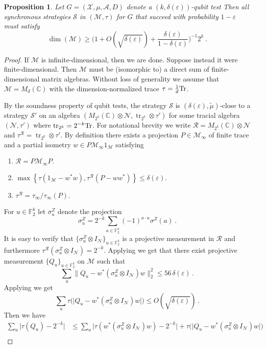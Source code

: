 \documentclass[11pt]{article}
\newtheorem{proposition}[theorem]{Proposition}
\theoremstyle{definition}
\newcommand{\strategy}{\mathscr{S}}
\newcommand{\Tr}{\mbox{\rm Tr}}
\newcommand{\C}{\ensuremath{\mathbb{C}}}
\newcommand{\F}{\ensuremath{\mathbb{F}}}
\newcommand{\mA}{\ensuremath{\mathcal{A}}}
\newcommand{\mM}{\ensuremath{\mathcal{M}}}
\newcommand{\mR}{\ensuremath{\mathcal{R}}}
\newcommand{\mX}{\ensuremath{\mathcal{X}}}
\newcommand{\eps}{\varepsilon}
\newcommand{\mN}{\mathcal{N}}
\DeclareMathOperator{\tr}{tr}
\begin{document}
\begin{proposition}
\label{prop:dim-test}
Let $G = (\mX,\mu,\mA,D)$ denote a $(k,\delta(\eps))$-qubit test Then all synchronous strategies $\strategy$ in $(\mM,\tau)$ for $G$ that succeed with probability $1 - \eps$ must satisfy 
\[
\dim(\mM) \geq \Big( 1 + O(\sqrt{\delta(\eps)}) + \frac{\delta(\eps)}{1 - \delta(\eps)}\Big)^{-1} 2^k~.
\]
\end{proposition}
\begin{proof}
If $\mM$ is infinite-dimensional, then we are done. Suppose instead it were finite-dimensional. Then $\mM$ must be (isomorphic to) a direct sum of finite-dimensional matrix algebras. Without loss of generality we assume that $\mM = M_{d}(\C)$ with the dimension-normalized trace $\tau = \frac{1}{d} \Tr$. 

By the soundness property of qubit tests, the strategy $\strategy$ is $(\delta(\eps),\tilde{\mu})$-close to a strategy $\strategy'$ on an algebra $(M_{2^k}(\C) \otimes \mN,\tr_{2^k} \otimes \tau')$ for some tracial algebra $(\mN,\tau')$ where $\tr_{2^k} = 2^{-k} \Tr$. For notational brevity we write $\mR = M_{2^k}(\C) \otimes \mN$ and $\tau^{\mR} = \tr_{2^k} \otimes \tau'$. By definition there exists a projection $P \in \mM_\infty$ of finite trace and a partial isometry $w \in P \mM_\infty 1_\mM$ satisfying
\begin{enumerate}
	\item $\mR = P \mM_\infty P$. 
	\item $\max \left \{ \tau(1_\mM - w^* w), \tau^{\mR} (P - w w^*) \right \} \leq \delta(\eps)$.
	\item $\tau^{\mR} = \tau_\infty/\tau_\infty(P)$.
\end{enumerate}
For $u \in \F_2^k$ let $\sigma^Z_u$ denote the projection
\[
	\sigma^Z_u = 2^{-k} \sum_{a \in \F_2^k} (-1)^{a \cdot u} \sigma^Z(a)~.
\]
It is easy to verify that $\{\sigma^Z_u \otimes I_\mN \}_{u \in \F_2^k}$ is a projective measurement in $\mR$ and furthermore $\tau^{\mR}(\sigma^Z_u \otimes I_\mN) = 2^{-k}$. Applying  we get that there exist projective measurement $\{Q_u\}_{u \in \F_2^k}$ on $\mM$ such that
\[
	\sum_u \| Q_u - w^* (\sigma^Z_u \otimes I_\mN) w \|_2^2 \leq 56\, \delta(\eps)~.
\]
Applying  we get
\[
	\sum_u \tau \Big ( \Big| Q_u - w^* (\sigma^Z_u \otimes I_\mN) w\Big| \Big) \leq O(\sqrt{\delta(\eps)})~.
\]
Then we have
\begin{align*}
	\sum_u \Big| \tau(Q_u) - 2^{-k} \Big| &\leq \sum_u \Big | \tau(w^* (\sigma^Z_u \otimes I_\mN) w) - 2^{-k} \Big| + \tau \Big ( \Big| Q_u - w^* (\sigma^Z_u \otimes I_\mN) w\Big| \Big) \\

\end{align*}
\end{proof}
\end{document}
